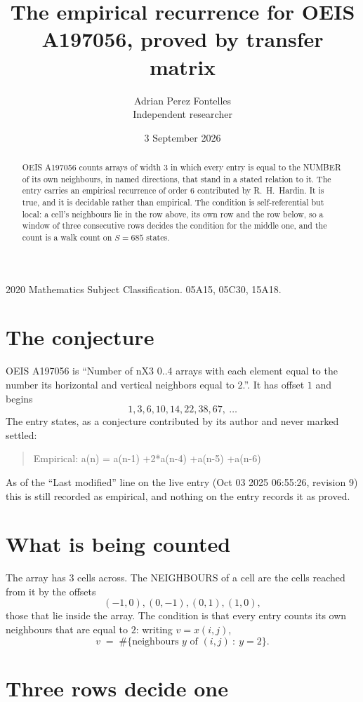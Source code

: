 \documentclass[11pt,a4paper]{article}
\title{The empirical recurrence for OEIS A197056, proved by transfer matrix}
\author{Adrian Perez Fontelles\\ \small Independent researcher}
\date{3 September 2026}
\theoremstyle{plain}
\theoremstyle{definition}
\begin{document}
\maketitle

\begin{abstract}
OEIS A197056 counts arrays of width $3$ in which every entry is equal to the NUMBER of its own
neighbours, in named directions, that stand in a stated relation to it. The entry carries an
empirical recurrence of order $6$ contributed by R.~H.~Hardin. It is true, and it is
decidable rather than empirical. The condition is self-referential but local: a cell's
neighbours lie in the row above, its own row and the row below, so a window of three
consecutive rows decides the condition for the middle one, and the count is a walk count on
$S=685$ states.
\end{abstract}

\noindent\small 2020 Mathematics Subject Classification. 05A15, 05C30, 15A18.\normalsize

\section{The conjecture}

OEIS A197056 is ``Number of nX3 0..4 arrays with each element equal to the number its horizontal and vertical neighbors equal to 2.''. It has offset $1$ and begins
\[
1, 3, 6, 10, 14, 22, 38, 67,\ \dots
\]
The entry states, as a conjecture contributed by its author and never marked settled:
\begin{quote}
Empirical: a(n) = a(n-1) +2*a(n-4) +a(n-5) +a(n-6)
\end{quote}
As of the ``Last modified'' line on the live entry (Oct 03 2025 06:55:26, revision 9) this is still
recorded as empirical, and nothing on the entry records it as proved.

\section{What is being counted}

The array has $3$ cells across. The NEIGHBOURS of a cell are the cells reached from it by the
offsets
\[
(-1,0), (0,-1), (0,1), (1,0),
\]
those that lie inside the array. The condition is that every entry counts its own neighbours
that are equal to $2$: writing $v=x(i,j)$,
\[
v\;=\;\#\{\text{neighbours } y \text{ of } (i,j)\ :\ y=2\} .
\]


\section{Three rows decide one}
\end{document}
